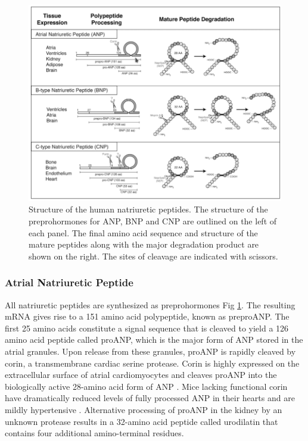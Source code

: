 \documentclass[14pt,a4paper,onecolumn]{extarticle}
\begin{document}
\begin{figure}
    \centering
    \includegraphics[scale=0.4]{../../images/NP_structure.png}
    \caption{Structure of the human natriuretic peptides. The structure of the preprohormones for ANP, BNP and CNP are outlined on the left of each panel. The final amino acid sequence and structure of the mature peptides along with the major degradation product are shown on the right. The sites of cleavage are indicated with scissors.}
    \label{NP_structure}
\end{figure}

\subsubsection{Atrial Natriuretic Peptide}

All natriuretic peptides are synthesized as preprohormones Fig \ref{NP_structure}.
The resulting mRNA gives rise to a 151 amino acid polypeptide, known as preproANP. The first 25 amino acids constitute a signal sequence that is cleaved to yield a 126 amino acid peptide called proANP, which is the major form of ANP stored in the atrial granules.
Upon release from these granules, proANP is rapidly cleaved by corin, a transmembrane cardiac serine protease. Corin is highly expressed on the extracellular surface of atrial cardiomyocytes and cleaves proANP into the biologically active 28-amino acid form of ANP \citep{Yan2000}.
Mice lacking functional corin have dramatically reduced levels of fully processed ANP in their hearts and are mildly hypertensive \citep{Chan2005}.
Alternative processing of proANP in the kidney by an unknown protease results in a 32-amino acid peptide called urodilatin that contains four additional amino-terminal residues.
\end{document}
